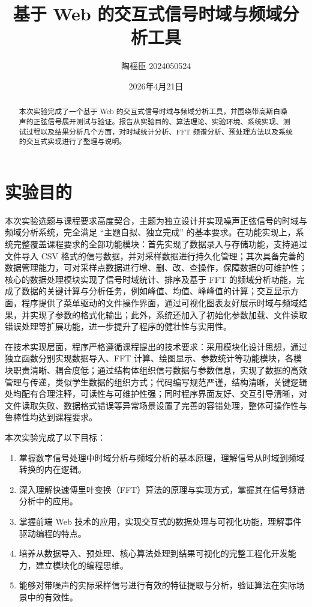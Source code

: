 \documentclass[11pt,a4paper]{ctexart}
\title{基于 Web 的交互式信号时域与频域分析工具}
\author{陶樞臣 2024050524}
\date{2026年4月21日}
\begin{document}
\maketitle

\begin{abstract}
本次实验完成了一个基于 Web 的交互式信号时域与频域分析工具，并围绕带高斯白噪声的正弦信号展开测试与验证。报告从实验目的、算法理论、实验环境、系统实现、测试过程以及结果分析几个方面，对时域统计分析、FFT 频谱分析、预处理方法以及系统的交互式实现进行了整理与说明。
\end{abstract}

\section{实验目的}

本次实验选题与课程要求高度契合，主题为独立设计并实现噪声正弦信号的时域与频域分析系统，完全满足 “主题自拟、独立完成” 的基本要求。在功能实现上，系统完整覆盖课程要求的全部功能模块：首先实现了数据录入与存储功能，支持通过文件导入 CSV 格式的信号数据，并对采样数据进行持久化管理；其次具备完善的数据管理能力，可对采样点数据进行增、删、改、查操作，保障数据的可维护性；核心的数据处理模块实现了信号时域统计、排序及基于 FFT 的频域分析功能，完成了数据的关键计算与分析任务，例如峰值、均值、峰峰值的计算；交互显示方面，程序提供了菜单驱动的文件操作界面，通过可视化图表友好展示时域与频域结果，并实现了参数的格式化输出；此外，系统还加入了初始化参数加载、文件读取错误处理等扩展功能，进一步提升了程序的健壮性与实用性。

在技术实现层面，程序严格遵循课程提出的技术要求：采用模块化设计思想，通过独立函数分别实现数据导入、FFT 计算、绘图显示、参数统计等功能模块，各模块职责清晰、耦合度低；通过结构体组织信号数据与参数信息，实现了数据的高效管理与传递，类似学生数据的组织方式；代码编写规范严谨，结构清晰，关键逻辑处均配有合理注释，可读性与可维护性强；同时程序界面友好、交互引导清晰，对文件读取失败、数据格式错误等异常场景设置了完善的容错处理，整体可操作性与鲁棒性均达到课程要求。

本次实验完成了以下目标：

\begin{enumerate}
  \item 掌握数字信号处理中时域分析与频域分析的基本原理，理解信号从时域到频域转换的内在逻辑。
  \item 深入理解快速傅里叶变换（FFT）算法的原理与实现方式，掌握其在信号频谱分析中的应用。
  \item 掌握前端 Web 技术的应用，实现交互式的数据处理与可视化功能，理解事件驱动编程的特点。
  \item 培养从数据导入、预处理、核心算法处理到结果可视化的完整工程化开发能力，建立模块化的编程思维。
  \item 能够对带噪声的实际采样信号进行有效的特征提取与分析，验证算法在实际场景中的有效性。
\end{enumerate}
\end{document}
